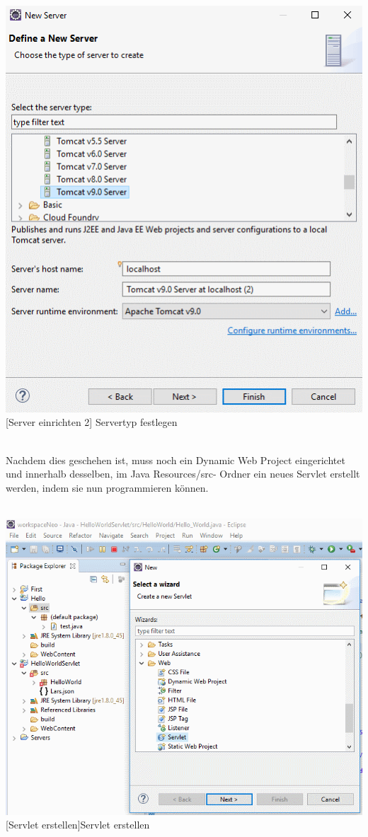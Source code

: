 \documentclass[12pt,a4paper,bibliography=totocnumbered,listof=totocnumbered]{scrartcl}
\begin{document}
\begin{minipage}{\linewidth}
	\centering
	\includegraphics[width=0.7\linewidth]{Bilder/Eclipse-ServerErstellen1.png}
	[Server einrichten 2]	{Servertyp festlegen}
	\label{fig:eclipse2}
\end{minipage}
\\

Nachdem dies geschehen ist, muss noch ein Dynamic Web Project eingerichtet und innerhalb desselben, im \glqq Java Resources/src\grqq-  Ordner ein neues Servlet erstellt werden, indem sie nun programmieren können.
\\
\\
\vspace{1em}
\begin{minipage}{\linewidth}
	\centering
	\includegraphics[width=0.7\linewidth]{Bilder/Eclipse-ServerErstellen2.png}
	[Servlet erstellen]{Servlet erstellen}	
	\label{fig:eclipse3}
\end{minipage}
\\
\end{document}

